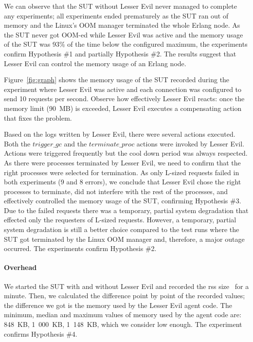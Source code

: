 \documentclass{llncs}
\begin{document}
We can observe that the SUT without Lesser Evil never managed to complete any experiments; all experiments ended prematurely as the SUT ran out of memory and the Linux's OOM manager terminated the whole Erlang node.  As the SUT never got OOM-ed while Lesser Evil was active and the memory usage of the SUT was 93\% of the time below the configured maximum, the experiments confirm Hypothesis \#1 and partially Hypothesis \#2. The results suggest that Lesser Evil can control the memory usage of an Erlang node.

Figure~\ref{fig:graph} shows the memory usage of the SUT recorded during the experiment where Lesser Evil was active and each connection was configured to send 10 requests per second. Observe how effectively Lesser Evil reacts: once the memory limit (90~MB) is exceeded, Lesser Evil executes a compensating action that fixes the problem.



Based on the logs written by Lesser Evil, there were several actions executed. Both the $\mathit{trigger\_gc}$ and the $\mathit{terminate\_proc}$ actions were invoked by Lesser Evil. Actions were triggered frequently but the cool down period was always respected. As there were processes terminated by Lesser Evil, we need to confirm that the right processes were selected for termination. As only L-sized requests failed in both experiments (9 and 8 errors), we conclude that Lesser Evil chose the right processes to terminate, did not interfere with the rest of the processes, and effectively controlled the memory usage of the SUT, confirming Hypothesis \#3. Due to the failed requests there was a temporary, partial system degradation that effected only the requesters of L-sized requests. However, a temporary, partial system degradation is still a better choice compared to the test runs where the SUT got terminated by the Linux OOM manager and, therefore, a major outage occurred. The experiments confirm Hypothesis \#2.

\paragraph{Overhead}
We started the SUT with and without Lesser Evil and recorded the rss size~\cite{ps} for a minute. Then, we calculated the difference point by point of the recorded values; the difference we got is the memory used by the Lesser Evil agent code. The minimum, median and maximum values of memory used by the agent code are: 848~KB, 1~000~KB, 1~148~KB, which  we consider low enough. The experiment confirms  Hypothesis \#4.
\end{document}
